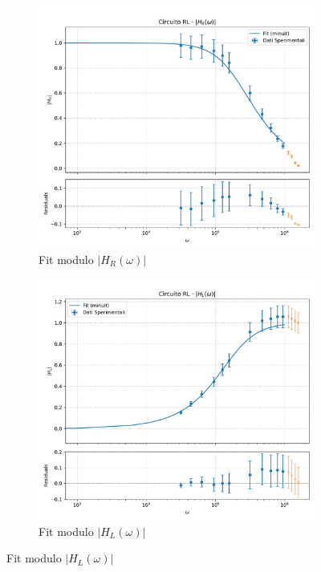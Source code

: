\documentclass[a4paper]{article}
\begin{document}
\begin{figure}[htbp] %
    \centering %
    \begin{subfigure}[b]{0.495\textwidth} %
        \centering
        \includegraphics[width=\linewidth]{grafici/rl_hr.pdf}
        \caption{Fit modulo $|H_R(\omega)|$}
        \label{fig:rl_hr}
    \end{subfigure}
    \hfill %
    \begin{subfigure}[b]{0.495\textwidth}
        \centering
        \includegraphics[width=\linewidth]{grafici/rl_hl.pdf}
        \caption{Fit modulo $|H_L(\omega)|$}
        \label{fig:rl_hl}
    \end{subfigure}


\end{figure}
\end{document}
